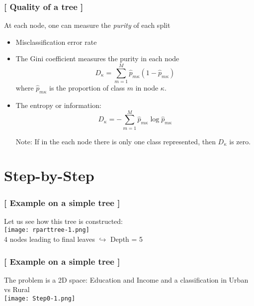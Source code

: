 \documentclass[xcolor=x11names,compress, handhouts]{beamer}
\renewcommand{\(}{\begin{columns}}
\renewcommand{\)}{\end{columns}}
\newcommand{\<}[1]{\begin{column}{#1}}
\renewcommand{\>}{\end{column}}
\begin{document}
\begin{frame}
\frametitle{\textcolor{brique}{[ Quality of a tree ]}}
At each node, one can measure the \textit{purity} of each split
\pause
\begin{itemize}[<+->]
    \item  Misclassification error rate
    \item  The Gini coefficient measures the purity in each node
$$
  D_{\kappa} = \sum_{m=1}^M  \widehat{p}_{m \kappa} (1-\widehat{p}_{m
  \kappa})
$$
  where $\widehat{p}_{m \kappa}$ is the proportion of class $m$ in
  node $\kappa$.  
    \item  The entropy or information:
 $$
  D_{\kappa} =   - \sum_{m=1}^M  \widehat{p}_{m \kappa}  \log
  \widehat{p}_{m \kappa}
  $$
  \item[Note:] If in the each node there is only one class   represented, then $D_{\kappa}$ is zero.  
  
\end{itemize}
\end{frame}


\section{Step-by-Step}

\begin{frame}
\frametitle{\textcolor{brique}{[ Example on a simple tree ]}}
Let us see how this tree is constructed:\\
\texttt{[image: rparttree-1.png]} \\
4 nodes leading to final leaves $\hookrightarrow$  Depth = 5 
\end{frame}

\begin{frame}
\frametitle{\textcolor{brique}{[ Example on a simple tree ]}}
The problem is a 2D space: Education and Income and a classification in Urban vs Rural\\
\texttt{[image: Step0-1.png]}
\end{frame}
\end{document}
